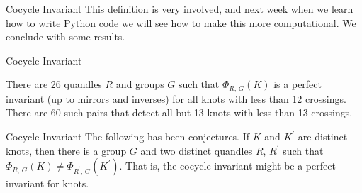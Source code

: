 \documentclass{beamer}
\begin{document}
    \begin{frame}{Cocycle Invariant}
        This definition is very involved, and next week when we learn
        how to write Python code we will see how to make this more
        computational. We conclude with some results.
    \end{frame}
    \begin{frame}{Cocycle Invariant}
        \begin{theorem}
            There are 26 quandles $R$ and groups $G$ such that
            $\Phi_{R,\,G}(K)$ is a perfect invariant (up to mirrors and
            inverses) for all knots with less than 12 crossings. There are
            60 such pairs that detect all but 13 knots with less than
            13 crossings.
        \end{theorem}
    \end{frame}
    \begin{frame}{Cocycle Invariant}
        The following has been conjectures. If $K$ and $K^{\prime}$ are
        distinct knots, then there is a group $G$ and two distinct
        quandles $R$, $R^{\prime}$ such that
        $\Phi_{R,\,G}(K)\ne\Phi_{R^{\prime},\,G}(K^{\prime})$. That is,
        the cocycle invariant might be a perfect invariant for knots.
    \end{frame}
\end{document}
